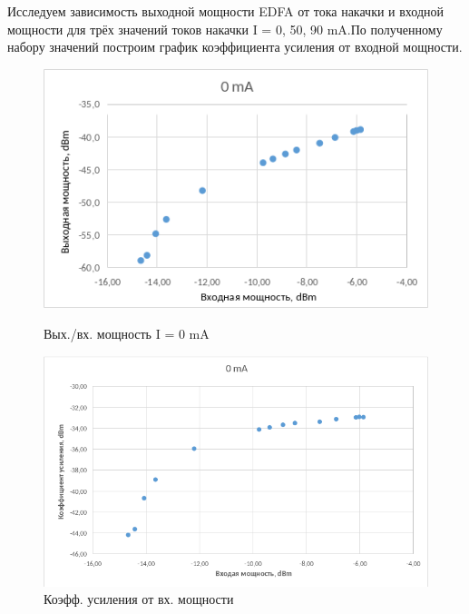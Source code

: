 \documentclass[12pt,a4paper]{article}
\begin{document}
	
Исследуем зависимость выходной мощности EDFA от тока накачки и входной мощности для трёх значений токов накачки I = 0, 50, 90 mA.По полученному набору значений построим график коэффициента усиления от входной мощности.

\begin{figure}[h!]
    \begin{center}
    \begin{minipage}[h!]{0.49\linewidth}
    \includegraphics[width = 1\textwidth]{point_4_0.png}
    \caption{Вых./вх. мощность I = 0 mA}
    \label{1}
    \end{minipage}
    \begin{minipage}[h!]{0.49\linewidth}
    \includegraphics[width = 1\textwidth]{point5_0.png}
    \caption{Коэфф. усиления от вх. мощности}
    \label{2}
    \end{minipage}
    \end{center}
\end{figure}  
\end{document}
